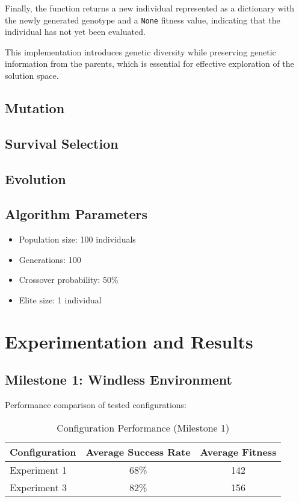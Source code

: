 \documentclass{article}
\begin{document}
Finally, the function returns a new individual represented as a dictionary with the newly generated genotype and a \texttt{None} fitness value, indicating that the individual has not yet been evaluated.

This implementation introduces genetic diversity while preserving genetic information from the parents, which is essential for effective exploration of the solution space.

\subsection{Mutation}
\subsection{Survival Selection}
\subsection{Evolution}

\subsection{Algorithm Parameters}
\begin{itemize}
    \item Population size: 100 individuals
    \item Generations: 100
    \item Crossover probability: 50\%
    \item Elite size: 1 individual
\end{itemize}

\section{Experimentation and Results}
\subsection{Milestone 1: Windless Environment}
Performance comparison of tested configurations:

\begin{table}[h]
\centering
\caption{Configuration Performance (Milestone 1)}
\begin{tabular}{@{}lcc@{}}
\toprule
Configuration & Average Success Rate & Average Fitness \\ 
\midrule
Experiment 1 & 68\% & 142 \\
Experiment 3 & 82\% & 156 \\
\bottomrule
\end{tabular}
\end{table}
\end{document}
